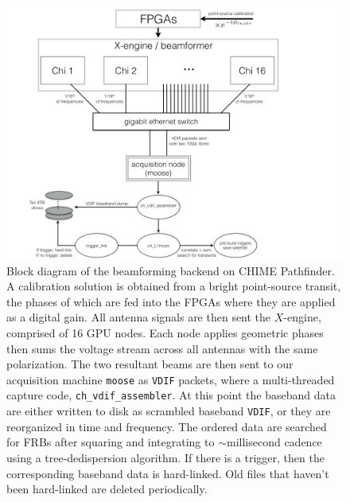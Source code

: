 \begin{figure}[!h]
\label{fig-bf_diagram}
\begin{center}
\includegraphics[trim={1.in, 0in, 2.5in, 0in}, width=1\textwidth]{./figures/beamforming/moose_diagram.png} 
\caption[abc]{Block diagram of the beamforming backend on CHIME Pathfinder. 
A calibration solution is obtained from a bright point-source transit, 
the phases of which are fed into the FPGAs where they are applied as a 
digital gain. All antenna signals are then sent the $X$-engine, 
comprised of 16 GPU nodes. Each node applies geometric phases then 
sums the voltage stream across all antennas with the same polarization. 
The two resultant beams are then sent to our acquisition machine {\tt moose} 
as {\tt VDIF} packets, where a multi-threaded capture code, {\tt ch\_vdif\_assembler}. 
At this point the baseband data are either written to disk as scrambled baseband 
{\tt VDIF}, or they are reorganized in time and frequency. The ordered data are 
searched for FRBs after squaring and integrating to $\sim$millisecond cadence 
using a tree-dedispersion algorithm. If there is a trigger, then the corresponding 
baseband data is hard-linked. Old files that haven't been hard-linked are deleted
periodically.}
\vspace{0.4cm}   
\end{center}
\end{figure}

